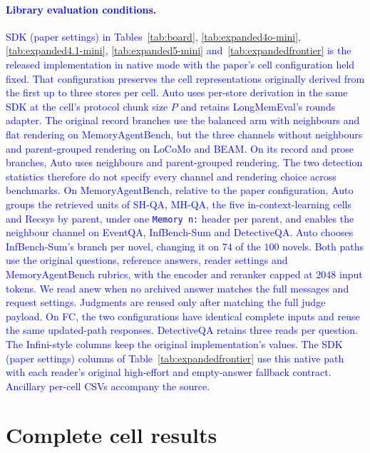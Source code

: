 \documentclass{article}
\newcommand{\nativechange}[1]{\textcolor{blue}{#1}}
\begin{document}
\paragraph{\nativechange{Library evaluation conditions.}} \nativechange{SDK (paper settings) in Tables~\ref{tab:board}, \ref{tab:expanded4o-mini}, \ref{tab:expanded4.1-mini}, \ref{tab:expanded5-mini} and~\ref{tab:expandedfrontier} is the released implementation in native mode with the paper's cell configuration held fixed. That configuration preserves the cell representations originally derived from the first up to three stores per cell. Auto uses per-store derivation in the same SDK at the cell's protocol chunk size $P$ and retains LongMemEval's rounds adapter. The original record branches use the balanced arm with neighbours and flat rendering on MemoryAgentBench, but the three channels without neighbours and parent-grouped rendering on LoCoMo and BEAM. On its record and prose branches, Auto uses neighbours and parent-grouped rendering. The two detection statistics therefore do not specify every channel and rendering choice across benchmarks. On MemoryAgentBench, relative to the paper configuration, Auto groups the retrieved units of SH-QA, MH-QA, the five in-context-learning cells and Recsys by parent, under one \texttt{Memory n:} header per parent, and enables the neighbour channel on EventQA, InfBench-Sum and DetectiveQA. Auto chooses InfBench-Sum's branch per novel, changing it on $74$ of the $100$ novels. Both paths use the original questions, reference answers, reader settings and MemoryAgentBench rubrics, with the encoder and reranker capped at $2048$ input tokens. We read anew when no archived answer matches the full messages and request settings. Judgments are reused only after matching the full judge payload. On FC, the two configurations have identical complete inputs and reuse the same updated-path responses. DetectiveQA retains three reads per question. The Infini-style columns keep the original implementation's values. The SDK (paper settings) columns of Table~\ref{tab:expandedfrontier} use this native path with each reader's original high-effort and empty-answer fallback contract. Ancillary per-cell CSVs accompany the source.}

\section{Complete cell results}\label{app:expanded}
\end{document}
